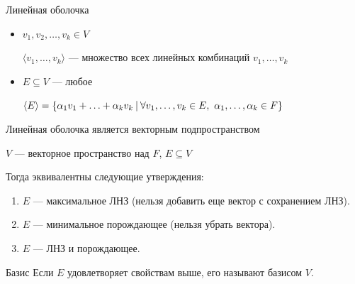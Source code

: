 \begin{defn}{Линейная оболочка}{}
    \begin{itemize}
        \item
            \( v_1, v_2, \ldots, v_k \in V \)

            \( \langle v_1, \ldots, v_k \rangle \) --- множество всех линейных комбинаций \( v_1, \ldots, v_k \)
        \item
            \( E \subseteq V \) --- любое

            \(
                \langle E \rangle = \{ \alpha_1 v_1 + \ldots + \alpha_k v_k
                \ \vline \
                \forall v_1, \ldots, v_k \in E, \ \alpha_1, \ldots, \alpha_k \in F \}
            \)
    \end{itemize}
\end{defn}

\begin{remark}{}{}
    Линейная оболочка является векторным подпространством
\end{remark}

\begin{thrm}{}{}
    \( V \) --- векторное пространство над \( F \), \( E \subseteq V \)

    Тогда эквивалентны следующие утверждения:
    \begin{enumerate}
        \item
            \( E \) --- максимальное ЛНЗ (нельзя добавить еще вектор с сохранением ЛНЗ).
        \item
            \( E \) --- минимальное порождающее (нельзя убрать вектора).
        \item
            \( E \) --- ЛНЗ и порождающее.
    \end{enumerate}
\end{thrm}

\begin{defn}{Базис}{}
    Если \( E \) удовлетворяет свойствам выше, его называют базисом \( V \).
\end{defn}

